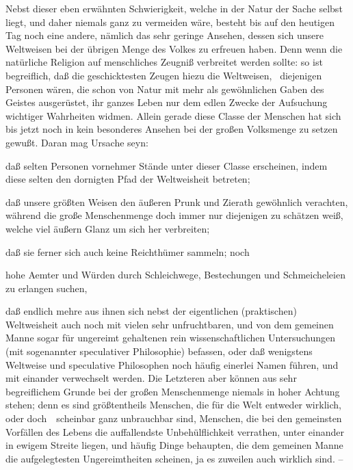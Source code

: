 \begin{aufza}
\item Nebst dieser eben erwähnten Schwierigkeit, welche in der Natur der Sache selbst liegt, und daher niemals ganz zu vermeiden wäre, besteht bis auf den heutigen Tag noch eine andere, nämlich das sehr geringe Ansehen, dessen sich unsere Weltweisen bei der übrigen Menge des Volkes zu erfreuen haben. Denn wenn die natürliche Religion auf menschliches Zeugniß verbreitet werden sollte: so ist begreiflich, daß die geschicktesten Zeugen hiezu die Weltweisen, \dh\ diejenigen Personen wären, die schon von Natur mit mehr als gewöhnlichen Gaben des Geistes ausgerüstet, ihr ganzes Leben nur dem edlen Zwecke der Aufsuchung wichtiger Wahrheiten widmen. Allein gerade diese Classe der Menschen hat sich bis jetzt noch in kein besonderes Ansehen bei der großen Volksmenge zu setzen gewußt. Daran mag Ursache seyn:
\begin{aufzb}
\item daß selten Personen vornehmer Stände unter dieser Classe erscheinen, indem diese selten den dornigten Pfad der Weltweisheit betreten;
\item daß unsere größten Weisen den äußeren Prunk und Zierath gewöhnlich verachten, während die große Menschenmenge doch immer nur diejenigen zu schätzen weiß, welche viel äußern Glanz um sich her verbreiten;
\item daß sie ferner sich auch keine Reichthümer sammeln; noch
\item hohe Aemter und Würden durch Schleichwege, Bestechungen und Schmeicheleien zu erlangen suchen, \udgl\ 
\item daß endlich mehre aus ihnen sich nebst der eigentlichen (praktischen) Weltweisheit auch noch mit vielen sehr unfruchtbaren, und von dem gemeinen Manne sogar für ungereimt gehaltenen rein wissenschaftlichen Untersuchungen (mit sogenannter speculativer Philosophie) befassen, oder daß wenigstens Weltweise und speculative Philosophen noch häufig einerlei Namen führen, und mit einander verwechselt werden. Die Letzteren aber können aus sehr begreiflichem Grunde bei der großen Menschenmenge niemals in hoher Achtung stehen; denn es sind größtentheils Menschen, die für die Welt entweder wirklich, oder doch~\ scheinbar ganz unbrauchbar sind, Menschen, die bei den gemeinsten Vorfällen des Lebens die auffallendste Unbehülflichkeit verrathen, unter einander in ewigem Streite liegen, und häufig Dinge behaupten, die dem gemeinen Manne die aufgelegtesten Ungereimtheiten scheinen, ja es zuweilen auch wirklich sind. --
\end{aufzb}
\end{aufza}\par

